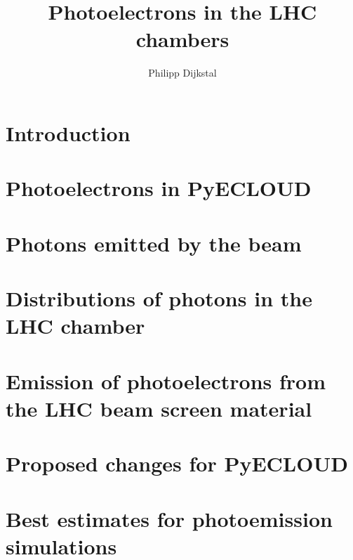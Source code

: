 \documentclass{scrartcl}
\title{Photoelectrons in the LHC chambers}
\author{Philipp Dijkstal}
\begin{document}
\maketitle
\tableofcontents

\section{Introduction}


\section{Photoelectrons in PyECLOUD}
    

\clearpage
\section{Photons emitted by the beam}
    

\clearpage
\section{Distributions of photons in the LHC chamber}
	

\clearpage
\section{Emission of photoelectrons from the LHC beam screen material}
	
    
    
    
    


\clearpage
\section{Proposed changes for PyECLOUD}
    

\clearpage
\section{Best estimates for photoemission simulations}
    

\clearpage
{}


\end{document}
